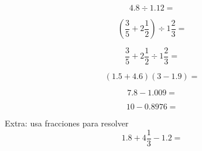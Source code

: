 \documentclass[11pt]{article}
\begin{document}
\begin{multicols}{2}

\begin{equation}
4.8 \div 1.12 =
\end{equation}

\vspace{4cm}

\begin{equation}
\left( \frac{3}{5}+ 2 \frac{1}{2} \right) \div 1\frac{2}{3} =
\end{equation}


\vspace{4cm}

\begin{equation}
\frac{3}{5}+ 2 \frac{1}{2} \div 1\frac{2}{3} =
\end{equation}

\vspace{4cm}

\begin{equation}
(1.5 + 4.6)(3 - 1.9)  =
\end{equation}

\vspace{4cm}

\begin{equation}
7.8 - 1.009 = 
\end{equation}

\vspace{4cm}

\begin{equation}
10 - 0.8976 =
\end{equation}

\vspace{4cm}

\end{multicols}

\vspace{4cm}


\noindent
Extra: usa fracciones para resolver 
\begin{equation}
1.8 + 4\frac{1}{3} - 1.2 =
\end{equation}
\end{document}
